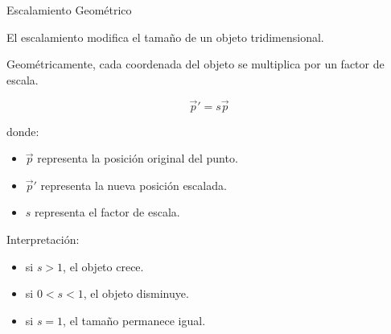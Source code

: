 \documentclass{beamer}
\begin{document}
\begin{frame}{Escalamiento Geométrico}

El escalamiento modifica el tamaño de un objeto tridimensional.

\vspace{0.5cm}

Geométricamente, cada coordenada del objeto se multiplica por un factor de escala.

\vspace{0.5cm}

$$
\vec{p}' = s\vec{p}
$$

\vspace{0.4cm}

donde:

\begin{itemize}
    \item $\vec{p}$ representa la posición original del punto.
    \item $\vec{p}'$ representa la nueva posición escalada.
    \item $s$ representa el factor de escala.
\end{itemize}

\vspace{0.5cm}

Interpretación:

\begin{itemize}
    \item si $s > 1$, el objeto crece.
    \item si $0 < s < 1$, el objeto disminuye.
    \item si $s = 1$, el tamaño permanece igual.
\end{itemize}

\end{frame}
\end{document}
